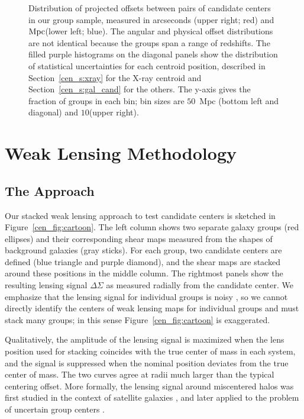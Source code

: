 \begin{figure*}[htb]
\caption{Distribution of projected offsets between pairs of candidate
  centers in our group sample, measured in arcseconds (upper right;
  red) and ${\rm Mpc} $(lower left; blue). The angular and physical
  offset distributions are not identical because the groups span a
  range of redshifts. The filled purple histograms on the diagonal
  panels show the distribution of statistical uncertainties for each
  centroid position, described in Section~\ref{cen_s:xray} for the X-ray
  centroid and Section~\ref{cen_s:gal_cand} for the others. The y-axis
  gives the fraction of groups in each bin; 
  bin sizes are $50$~\rm{Mpc} (bottom left and diagonal) and
  $10$\arcsec (upper right).}
\label{cen_fig:offsets}
\end{figure*}



\section{Weak Lensing Methodology}
\label{cen_s:lensing}

\subsection{The Approach}

Our stacked weak lensing approach to test candidate centers is
sketched in Figure~\ref{cen_fig:cartoon}. The left column shows two
separate galaxy groups (red ellipses) and their corresponding shear
maps measured from the shapes of background galaxies (gray
sticks). For each group, two candidate centers are defined (blue
triangle and purple diamond), and the shear maps are stacked around
these positions in the middle column. The rightmost panels show the
resulting lensing signal $\Delta\Sigma$ as measured radially from the
candidate center. We emphasize that the lensing signal for individual
groups is noisy \citep[signal-to-noise $\sim1$;
see Figure 1 of ][]{Leauthaud2010}, so we cannot directly identify the
centers of weak lensing maps for individual groups and must stack many
groups; in this sense Figure~\ref{cen_fig:cartoon} is exaggerated.

Qualitatively, the amplitude of the lensing signal is maximized when
the lens position used for stacking coincides with the true center of
mass in each system, and the signal is suppressed when the nominal
position deviates from the true center of mass. The two curves agree
at radii much larger than the typical centering offset.  More
formally, the lensing signal around miscentered halos was first
studied in the context of satellite galaxies \citep{Natarajan1997,
  Hudson1998, Guzik2002, Yang2003, Yang2006}, and later applied to the
problem of uncertain group centers \citep{Johnston2007a,
  Johnston2007b}.


